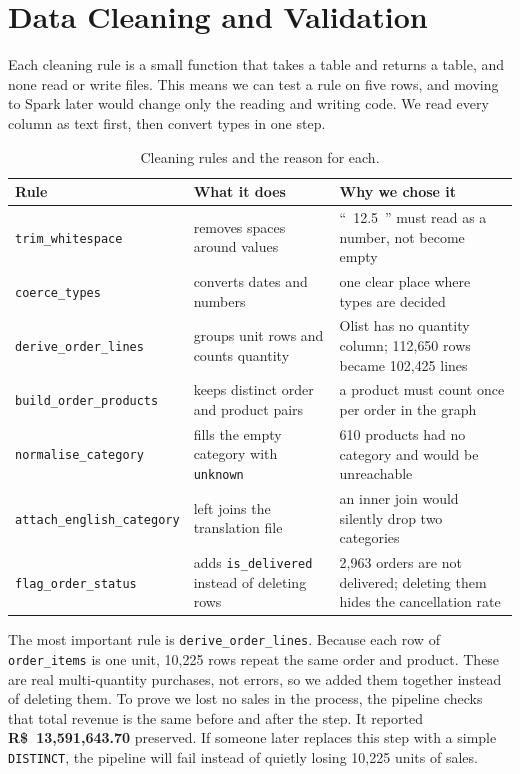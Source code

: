 \documentclass[11pt,a4paper]{article}
\newcommand{\code}[1]{\texttt{\small #1}}
\begin{document}
\section{Data Cleaning and Validation}
Each cleaning rule is a small function that takes a table and returns a table, and none read or
write files. This means we can test a rule on five rows, and moving to Spark later would change
only the reading and writing code. We read every column as text first, then convert types in
one step.

\begin{table}[h]
\centering\footnotesize
\begin{tabular}{@{}p{3.3cm}p{4.6cm}p{7.4cm}@{}}
\toprule
\textbf{Rule} & \textbf{What it does} & \textbf{Why we chose it} \\
\midrule
\code{trim\_whitespace} & removes spaces around values & ``~12.5~'' must read as a number, not become empty \\
\code{coerce\_types} & converts dates and numbers & one clear place where types are decided \\
\code{derive\_order\_lines} & groups unit rows and counts quantity & Olist has no quantity column; 112{,}650 rows became 102{,}425 lines \\
\code{build\_order\_products} & keeps distinct order and product pairs & a product must count once per order in the graph \\
\code{normalise\_category} & fills the empty category with \code{unknown} & 610 products had no category and would be unreachable \\
\code{attach\_english\_category} & left joins the translation file & an inner join would silently drop two categories \\
\code{flag\_order\_status} & adds \code{is\_delivered} instead of deleting rows & 2{,}963 orders are not delivered; deleting them hides the cancellation rate \\
\bottomrule
\end{tabular}
\caption{Cleaning rules and the reason for each.}
\end{table}

The most important rule is \code{derive\_order\_lines}. Because each row of \code{order\_items}
is one unit, 10{,}225 rows repeat the same order and product. These are real multi-quantity
purchases, not errors, so we added them together instead of deleting them. To prove we lost no
sales in the process, the pipeline checks that total revenue is the same before and after the
step. It reported \textbf{R\$~13{,}591{,}643.70} preserved. If someone later replaces this step
with a simple \code{DISTINCT}, the pipeline will fail instead of quietly losing 10{,}225 units
of sales.
\end{document}
